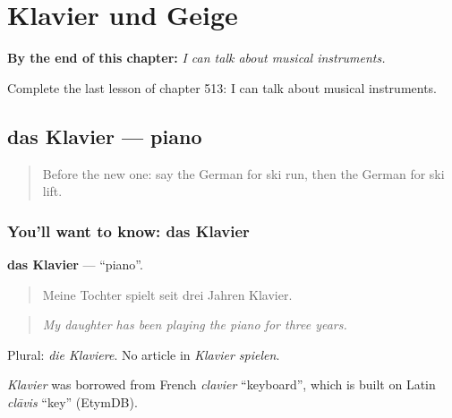 
\chapter{Klavier und Geige}
\label{ch:ge-klavier-und-geige}

\begin{chapteropening}
\textbf{By the end of this chapter:} \emph{I can talk about musical instruments.}

Complete the last lesson of chapter 513: I can talk about musical instruments.
\end{chapteropening}

\section[das Klavier]{das Klavier — piano}

\label{lesson:GE-C513-klavier}



\begin{quote}
Before the new one: say the German for ski run, then the German for ski lift.
\end{quote}

\subsection*{You'll want to know: das Klavier}
\textbf{das Klavier} — \textquotedblleft{}piano\textquotedblright{}.

\begin{quote}
Meine Tochter spielt seit drei Jahren Klavier.
\end{quote}

\begin{quote}
\emph{My daughter has been playing the piano for three years.}
\end{quote}

Plural: \emph{die Klaviere}. No article in \emph{Klavier spielen}.

\begin{cousinweb}
\emph{Klavier} was borrowed from French \emph{clavier} \textquotedblleft{}keyboard\textquotedblright{}, which is built on Latin \emph{clāvis} \textquotedblleft{}key\textquotedblright{} (EtymDB).
\end{cousinweb}

